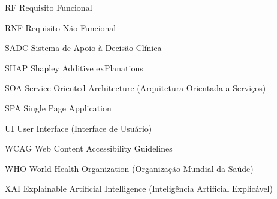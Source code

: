 \begin{siglas}
\item[RF] Requisito Funcional
\item[RNF] Requisito Não Funcional
\item[SADC] Sistema de Apoio à Decisão Clínica
\item[SHAP] Shapley Additive exPlanations
\item[SOA] Service-Oriented Architecture (Arquitetura Orientada a Serviços)
\item[SPA] Single Page Application
\item[UI] User Interface (Interface de Usuário)
\item[WCAG] Web Content Accessibility Guidelines
\item[WHO] World Health Organization (Organização Mundial da Saúde)
\item[XAI] Explainable Artificial Intelligence (Inteligência Artificial Explicável)
\end{siglas}

\tableofcontents*
\cleardoublepage
